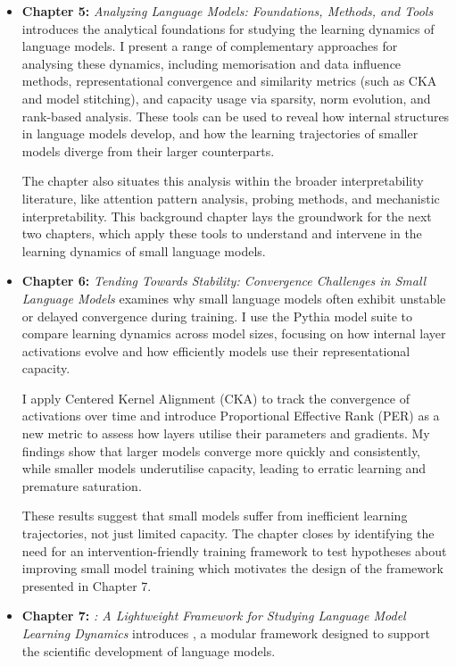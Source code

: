 \begin{itemize}
    \item \textbf{Chapter 5:} \emph{Analyzing Language Models: Foundations, Methods, and Tools} introduces the analytical foundations for studying the learning dynamics of language models. I present a range of complementary approaches for analysing these dynamics, including memorisation and data influence methods, representational convergence and similarity metrics (such as CKA and model stitching), and capacity usage via sparsity, norm evolution, and rank-based analysis. These tools can be used to reveal how internal structures in language models develop, and how the learning trajectories of smaller models diverge from their larger counterparts.

    The chapter also situates this analysis within the broader interpretability literature, like attention pattern analysis, probing methods, and mechanistic interpretability. This background chapter lays the groundwork for the next two chapters, which apply these tools to understand and intervene in the learning dynamics of small language models.

    \item \textbf{Chapter 6:} \emph{Tending Towards Stability: Convergence Challenges in Small Language Models} examines why small language models often exhibit unstable or delayed convergence during training. I use the Pythia model suite to compare learning dynamics across model sizes, focusing on how internal layer activations evolve and how efficiently models use their representational capacity.

    I apply Centered Kernel Alignment (CKA) to track the convergence of activations over time and introduce Proportional Effective Rank (PER) as a new metric to assess how layers utilise their parameters and gradients. My findings show that larger models converge more quickly and consistently, while smaller models underutilise capacity, leading to erratic learning and premature saturation.
    
    These results suggest that small models suffer from inefficient learning trajectories, not just limited capacity. The chapter closes by identifying the need for an intervention-friendly training framework to test hypotheses about improving small model training which motivates the design of the \pico framework presented in Chapter 7.

    \item \textbf{Chapter 7:} \emph{\pico: A Lightweight Framework for Studying Language Model Learning Dynamics} introduces \pico, a modular framework designed to support the scientific development of language models.


\end{itemize}
